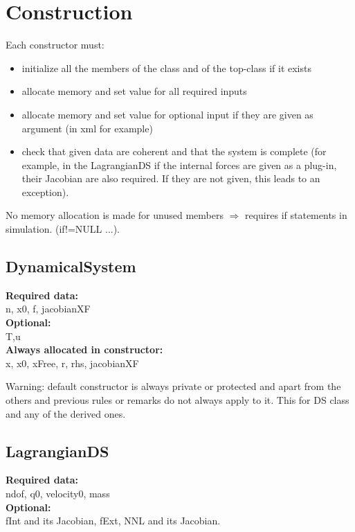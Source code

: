 \documentclass[10pt]{report}
\begin{document}
\section{Construction}

Each constructor must:
\begin{itemize}
\item initialize all the members of the class and of the top-class if it exists
\item allocate memory and set value for all required inputs
\item allocate memory and set value for optional input if they are given as argument (in xml for example)
\item check that given data are coherent and that the system is complete (for example, in the LagrangianDS
if the internal forces are given as a plug-in, their Jacobian are also required. If they are not given, this leads to an exception).
\end{itemize}

No memory allocation is made for unused members $\Rightarrow$ requires if statements in simulation.  (if!=NULL ...).\\

\subsection{DynamicalSystem}

{\bf Required data:}\\
n, x0, f, jacobianXF \\
{\bf Optional:}\\
T,u \\

\textbf{Always allocated in constructor:} \\
x, x0, xFree, r, rhs, jacobianXF

Warning: default constructor is always private or protected and apart from the others and previous rules or remarks do not always apply to it. 
This for DS class and any of the derived ones. 

\subsection{LagrangianDS}

\textbf{Required data:}\\
ndof, q0, velocity0, mass \\
\textbf{Optional:}\\
fInt and its Jacobian, fExt, NNL and its Jacobian. \\
\end{document}
